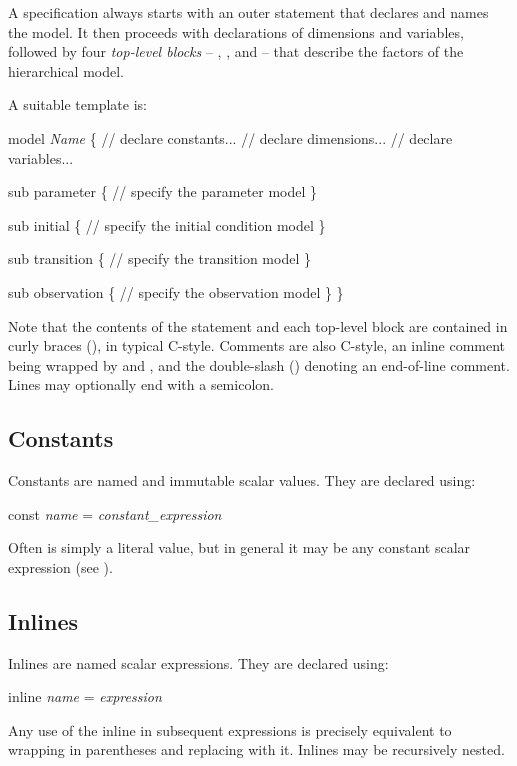 A specification always starts with an outer  statement that
declares and names the model. It then proceeds with declarations of dimensions
and variables, followed by four \emph{top-level blocks} --
, ,  and
 -- that describe the factors of the hierarchical model.

A suitable template is:
\begin{bicode}
model \textsl{Name} \{
  // declare constants...
  // declare dimensions...
  // declare variables...

  sub parameter \{
    // specify the parameter model
  \}

  sub initial \{
    // specify the initial condition model
  \}

  sub transition \{
    // specify the transition model
  \}

  sub observation \{
    // specify the observation model
  \}
\}
\end{bicode}

Note that the contents of the  statement and each top-level block
are contained in curly braces (\bitt{\{\(\ldots\)\}}), in typical
C-style. Comments are also C-style, an inline comment being wrapped by
\bitt{/*} and \bitt{*/}, and the double-slash (\bitt{//}) denoting an
end-of-line comment. Lines may optionally end with a semicolon.

\subsection{Constants\label{Constants}}

Constants are named and immutable scalar values. They are declared using:
\begin{bicode}
const \emph{name} = \emph{constant_expression}
\end{bicode}
Often  is simply a literal value, but in
general it may be any constant scalar expression (see
).

\subsection{Inlines\label{Inlines}}

Inlines are named scalar expressions. They are declared using:
\begin{bicode}
inline \emph{name} = \emph{expression}
\end{bicode}
Any use of the inline  in subsequent expressions is
precisely equivalent to wrapping  in parentheses and
replacing  with it. Inlines may be recursively nested.

